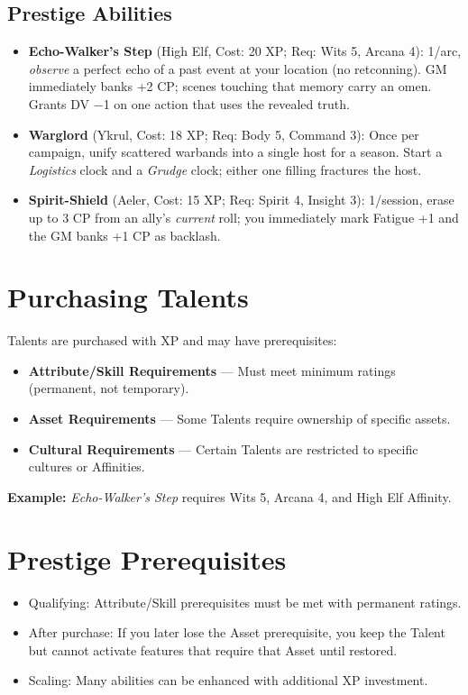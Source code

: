 \subsection*{Prestige Abilities}

\begin{itemize}
    \item \textbf{Echo-Walker's Step} (High Elf, Cost: 20 XP; Req: Wits 5, Arcana 4): 
1/arc, \emph{observe} a perfect echo of a past event at your location (no retconning). 
GM immediately banks +2 CP; scenes touching that memory carry an omen. Grants DV −1 on one action that uses the revealed truth.
    \item \textbf{Warglord} (Ykrul, Cost: 18 XP; Req: Body 5, Command 3): 
Once per campaign, unify scattered warbands into a single host for a season. Start a \emph{Logistics} clock and a \emph{Grudge} clock; either one filling fractures the host.
    \item \textbf{Spirit-Shield} (Aeler, Cost: 15 XP; Req: Spirit 4, Insight 3): 
1/session, erase up to 3 CP from an ally's \emph{current} roll; you immediately mark Fatigue +1 and the GM banks +1 CP as backlash.
\end{itemize}

\section{Purchasing Talents}

Talents are purchased with XP and may have prerequisites:

\begin{itemize}
  \item \textbf{Attribute/Skill Requirements} — Must meet minimum ratings (permanent, not temporary).
  \item \textbf{Asset Requirements} — Some Talents require ownership of specific assets.
  \item \textbf{Cultural Requirements} — Certain Talents are restricted to specific cultures or Affinities.
\end{itemize}

\textbf{Example:} \textit{Echo-Walker's Step} requires Wits 5, Arcana 4, and High Elf Affinity.

\section{Prestige Prerequisites}

\begin{itemize}
    \item Qualifying: Attribute/Skill prerequisites must be met with permanent ratings.
    \item After purchase: If you later lose the Asset prerequisite, you keep the Talent but cannot activate features that require that Asset until restored.
    \item Scaling: Many abilities can be enhanced with additional XP investment.
\end{itemize}

